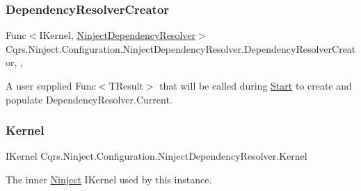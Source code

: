 \subsubsection{\texorpdfstring{Dependency\+Resolver\+Creator}{DependencyResolverCreator}}
{\footnotesize\ttfamily Func$<$I\+Kernel, \hyperlink{classCqrs_1_1Ninject_1_1Configuration_1_1NinjectDependencyResolver}{Ninject\+Dependency\+Resolver}$>$ Cqrs.\+Ninject.\+Configuration.\+Ninject\+Dependency\+Resolver.\+Dependency\+Resolver\+Creator\hspace{0.3cm}{\ttfamily [static]}, {\ttfamily [get]}, {\ttfamily [set]}}



A user supplied Func$<$\+T\+Result$>$ that will be called during \hyperlink{classCqrs_1_1Ninject_1_1Configuration_1_1NinjectDependencyResolver_adc6171ed45679dcbaa67782770ba5083_adc6171ed45679dcbaa67782770ba5083}{Start} to create and populate Dependency\+Resolver.\+Current. 

\mbox{\label{classCqrs_1_1Ninject_1_1Configuration_1_1NinjectDependencyResolver_a507ba37916f7e77cd5bbcc14543c03b5_a507ba37916f7e77cd5bbcc14543c03b5}} 
\subsubsection{\texorpdfstring{Kernel}{Kernel}}
{\footnotesize\ttfamily I\+Kernel Cqrs.\+Ninject.\+Configuration.\+Ninject\+Dependency\+Resolver.\+Kernel\hspace{0.3cm}{\ttfamily [get]}}



The inner \hyperlink{namespaceCqrs_1_1Ninject}{Ninject} I\+Kernel used by this instance. 

